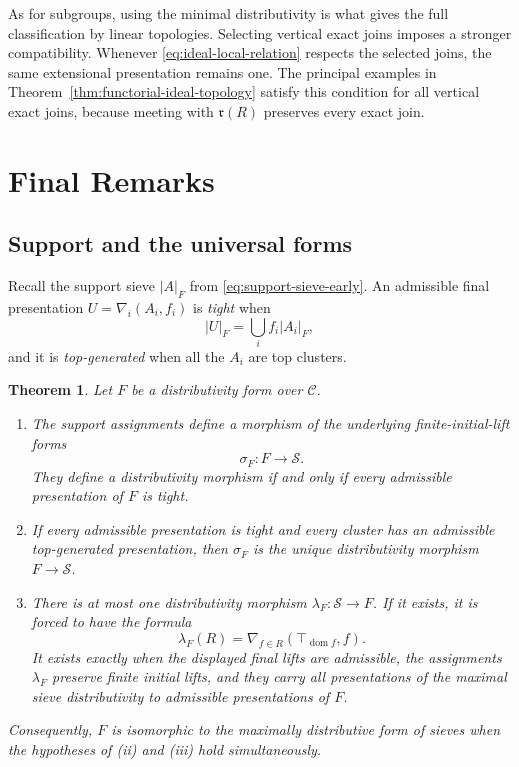 \documentclass[12pt,oneside,reqno]{amsart}
\newtheorem{theorem}{Theorem}[section]
\theoremstyle{definition}
\theoremstyle{remark}
\newcommand{\C}{\mathcal C}
\newcommand{\Sieve}{\mathscr S}
\newcommand{\supp}[2][]{\lvert #2\rvert_{#1}}
\begin{document}
As for subgroups, using the minimal distributivity is what gives the
full classification by linear topologies.  Selecting vertical exact
joins imposes a stronger compatibility.  Whenever
\eqref{eq:ideal-local-relation} respects the selected joins, the same
extensional presentation remains one.  The principal examples in
Theorem~\ref{thm:functorial-ideal-topology} satisfy this condition for
all vertical exact joins, because meeting with \(\mathfrak r(R)\)
preserves every exact join.

\section{Final Remarks}
\label{sec:final-remarks}

\subsection{Support and the universal forms}

Recall the support sieve \(\supp[F]{A}\) from
\eqref{eq:support-sieve-early}.  An admissible final presentation
\(U=\nabla_i(A_i,f_i)\) is \emph{tight} when
\[
           \supp[F]{U}=\bigcup_i f_i\supp[F]{A_i},
\]
and it is \emph{top-generated} when all the \(A_i\) are top clusters.

\begin{theorem}\label{thm:universal-sieve-form}
Let \(F\) be a distributivity form over \(\C\).
\begin{enumerate}[label=\textup{(\roman*)}]
\item The support assignments define a morphism of the underlying
finite-initial-lift forms
\[
                         \sigma_F:F\longrightarrow\Sieve.
\]
They define a distributivity morphism if and only if every admissible
presentation of \(F\) is tight.
\item If every admissible presentation is tight and every cluster has
an admissible top-generated presentation, then \(\sigma_F\) is the
unique distributivity morphism \(F\to\Sieve\).
\item There is at most one distributivity morphism
\(\lambda_F:\Sieve\to F\).  If it exists, it is forced to have the
formula
\begin{equation}\label{eq:lambda-formula}
 \lambda_F(R)=\nabla_{f\in R}(\top_{\operatorname{dom}f},f).
\end{equation}
It exists exactly when the displayed final lifts are admissible, the
assignments \(\lambda_F\) preserve finite initial lifts, and they carry
all presentations of the maximal sieve distributivity to admissible
presentations of \(F\).
\end{enumerate}
Consequently, \(F\) is isomorphic to the maximally distributive form
of sieves when the hypotheses of (ii) and (iii) hold simultaneously.
\end{theorem}
\end{document}
